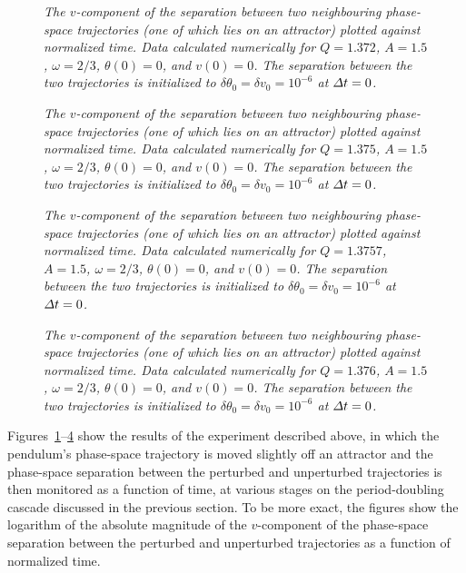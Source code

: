 \begin{figure}
\epsfysize=2.5in
\centerline{}
\caption{\em The $v$-component of the separation between two neighbouring
phase-space trajectories (one of which lies on an attractor) plotted against normalized time. Data
 calculated numerically for $Q=1.372$, 
$A=1.5$, $\omega=2/3$, $\theta(0)=0$, and $v(0)=0$. The separation between the
two trajectories is initialized to $\delta\theta_0=\delta v_0 = 10^{-6}$ at
${\mit\Delta} t = 0$.}\label{f40}
\end{figure}

\begin{figure}
\epsfysize=2.5in
\centerline{}
\caption{\em The $v$-component of the separation between two neighbouring
phase-space trajectories  (one of which lies on an attractor) plotted against normalized time. Data
 calculated numerically for $Q=1.375$, 
$A=1.5$, $\omega=2/3$, $\theta(0)=0$, and $v(0)=0$. The separation between the
two trajectories is initialized to $\delta\theta_0=\delta v_0 = 10^{-6}$ at
${\mit\Delta} t = 0$.}\label{f41}
\end{figure}

\begin{figure}
\epsfysize=2.5in
\centerline{}
\caption{\em The $v$-component of the separation between two neighbouring
phase-space trajectories (one of which lies on an attractor) plotted against normalized time. Data
calculated numerically for $Q=1.3757$, 
$A=1.5$, $\omega=2/3$, $\theta(0)=0$, and $v(0)=0$. The separation between the
two trajectories is initialized to $\delta\theta_0=\delta v_0 = 10^{-6}$ at
${\mit\Delta} t = 0$.}\label{f42}
\end{figure}

\begin{figure}
\epsfysize=2.5in
\centerline{}
\caption{\em The $v$-component of the separation between two neighbouring
phase-space trajectories (one of which lies on an attractor) plotted against normalized time. Data
 calculated numerically for $Q=1.376$, 
$A=1.5$, $\omega=2/3$, $\theta(0)=0$, and $v(0)=0$. The separation between the
two trajectories is initialized to $\delta\theta_0=\delta v_0 = 10^{-6}$ at
${\mit\Delta} t = 0$.}\label{fx43}
\end{figure}

Figures~\ref{f40}--\ref{fx43} show the results of the experiment described above,
in which the pendulum's phase-space trajectory is moved slightly off an attractor
and the phase-space separation between the perturbed and unperturbed trajectories
is then monitored as a function of time,
at various stages on the period-doubling cascade discussed in the previous section. 
To be more exact, the figures show the logarithm of the absolute magnitude of the
$v$-component of the phase-space separation between the perturbed and unperturbed
trajectories as  a function of normalized time.

